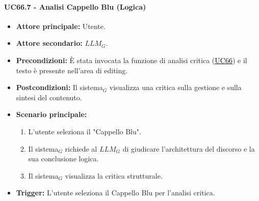 \documentclass[a4paper, 10pt]{article}
\newcommand{\uclink}[2]{\hyperlink{#1}{\textcolor{black}{\underline{#2}}}}
\begin{document}
\hypertarget{uc:66.7}{}
\paragraph{UC66.7 - Analisi Cappello Blu (Logica)}
\begin{itemize}
    \item \textbf{Attore principale:} Utente.
    \item \textbf{Attore secondario:} $LLM_G$.
    \item \textbf{Precondizioni:} È stata invocata la funzione di analisi critica (\uclink{uc:66}{UC66}) e il testo è presente nell'area di editing.
    \item \textbf{Postcondizioni:} Il sistema$_G$ visualizza una critica sulla gestione e sulla sintesi del contenuto.
    \item \textbf{Scenario principale:}
    \begin{enumerate}
        \item L'utente seleziona il "Cappello Blu".
        \item Il sistema$_G$ richiede al $LLM_G$ di giudicare l'architettura del discorso e la sua conclusione logica.
        \item Il sistema$_G$ visualizza la critica strutturale.
    \end{enumerate}
    \item \textbf{Trigger:} L'utente seleziona il Cappello Blu per l'analisi critica.
\end{itemize}
\end{document}
